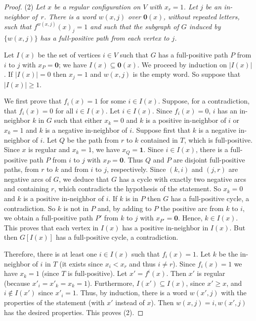 \documentclass[11pt,letter]{article}
\newcommand{\ONE}{\mathbf{1}}
\newcommand{\ZERO}{{\mathbf{0}}}
\begin{document}
\begin{proof}
\bigskip
\noindent
(2) {\em Let $x$ be a regular configuration on $V$ with $x_{r}=1$. Let $j$ be an in-neighbor of~$r$. There is a word $w(x,j)$ over $\ZERO(x)$, without repeated letters, such that $f^{w(x,j)}(x)_j=1$ and such that the subgraph of $G$ induced by $\{w(x,j)\}$ has a full-positive path from each vertex to $j$.}

\medskip
\noindent
Let $I(x)$ be the set of vertices $i\in V$ such that $G$ has a full-positive path $P$ from $i$ to $j$ with $x_P=\ZERO$; we have $I(x)\subseteq \ZERO(x)$. We proceed by induction on $|I(x)|$. If $|I(x)|=0$ then $x_j=1$ and $w(x,j)$ is the empty word. So suppose that $|I(x)|\geq 1$. 

\medskip
We first prove that $f_i(x)=1$ for some $i\in I(x)$. Suppose, for a contradiction, that $f_i(x)=0$ for all $i\in I(x)$. Let $i\in I(x)$. Since $f_i(x)=0$, $i$ has an in-neighbor $k$ in $G$ such that either $x_k=0$ and $k$ is a positive in-neighbor of $i$ or $x_k=1$ and $k$ is a negative in-neighbor of $i$. Suppose first that $k$ is a negative in-neighbor of $i$. Let $Q$ be the path from $r$ to $k$ contained in $T$, which is full-positive. Since $x$ is regular and $x_k=1$, we have $x_Q=\ONE$. Since $i\in I(x)$, there is a full-positive path $P$ from $i$ to $j$ with $x_P=\ZERO$. Thus $Q$ and $P$ are disjoint full-positive paths, from $r$ to $k$ and from $i$ to $j$, respectively. Since $(k,i)$ and $(j,r)$ are negative arcs of $G$, we deduce that $G$ has a cycle with exactly two negative arcs and containing $r$, which contradicts the hypothesis of the statement. So $x_k=0$ and $k$ is a positive in-neighbor of $i$. If $k$ is in $P$ then $G$ has a full-positive cycle, a contradiction. So $k$ is not in $P$ and, by adding to $P$ the positive arc from $k$ to $i$, we obtain a full-positive path $P'$ from $k$ to $j$ with $x_{P'}=\ZERO$. Hence, $k\in I(x)$. This proves that each vertex in $I(x)$ has a positive in-neighbor in $I(x)$. But then $G[I(x)]$ has a full-positive cycle, a contradiction. 


\medskip
Therefore, there is at least one $i\in I(x)$ such that $f_i(x)=1$. Let $k$ be the in-neighbor of $i$ in $T$ (it exists since $x_i<x_{r}$ and thus $i\neq r$). Since $f_i(x)=1$ we have $x_k=1$ (since $T$ is full-positive). Let $x'=f^i(x)$. Then $x'$ is regular (because $x'_i=x'_k=x_k=1$). Furthermore, $I(x')\subseteq I(x)$, since $x'\geq x$, and $i\not\in I(x')$ since $x'_i=1$. Thus, by induction, there is a word $w(x',j)$ with the properties of the statement (with $x'$ instead of $x$). Then $w(x,j)=i,w(x',j)$ has the desired properties. This proves (2). 


\end{proof}
\end{document}
